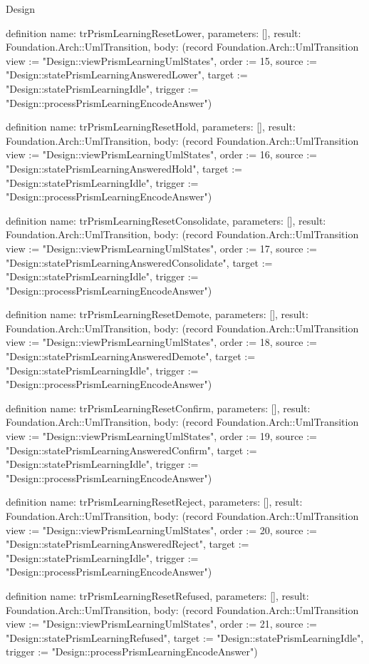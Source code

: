 \begin{lexlean}{Design}
\begin{semanticmodule}
definition{
  name: trPrismLearningResetLower,
  parameters: [],
  result: Foundation.Arch::UmlTransition,
  body: (record Foundation.Arch::UmlTransition {view := "Design::viewPrismLearningUmlStates", order := 15, source := "Design::statePrismLearningAnsweredLower", target := "Design::statePrismLearningIdle", trigger := "Design::processPrismLearningEncodeAnswer"})
}

definition{
  name: trPrismLearningResetHold,
  parameters: [],
  result: Foundation.Arch::UmlTransition,
  body: (record Foundation.Arch::UmlTransition {view := "Design::viewPrismLearningUmlStates", order := 16, source := "Design::statePrismLearningAnsweredHold", target := "Design::statePrismLearningIdle", trigger := "Design::processPrismLearningEncodeAnswer"})
}

definition{
  name: trPrismLearningResetConsolidate,
  parameters: [],
  result: Foundation.Arch::UmlTransition,
  body: (record Foundation.Arch::UmlTransition {view := "Design::viewPrismLearningUmlStates", order := 17, source := "Design::statePrismLearningAnsweredConsolidate", target := "Design::statePrismLearningIdle", trigger := "Design::processPrismLearningEncodeAnswer"})
}

definition{
  name: trPrismLearningResetDemote,
  parameters: [],
  result: Foundation.Arch::UmlTransition,
  body: (record Foundation.Arch::UmlTransition {view := "Design::viewPrismLearningUmlStates", order := 18, source := "Design::statePrismLearningAnsweredDemote", target := "Design::statePrismLearningIdle", trigger := "Design::processPrismLearningEncodeAnswer"})
}

definition{
  name: trPrismLearningResetConfirm,
  parameters: [],
  result: Foundation.Arch::UmlTransition,
  body: (record Foundation.Arch::UmlTransition {view := "Design::viewPrismLearningUmlStates", order := 19, source := "Design::statePrismLearningAnsweredConfirm", target := "Design::statePrismLearningIdle", trigger := "Design::processPrismLearningEncodeAnswer"})
}

definition{
  name: trPrismLearningResetReject,
  parameters: [],
  result: Foundation.Arch::UmlTransition,
  body: (record Foundation.Arch::UmlTransition {view := "Design::viewPrismLearningUmlStates", order := 20, source := "Design::statePrismLearningAnsweredReject", target := "Design::statePrismLearningIdle", trigger := "Design::processPrismLearningEncodeAnswer"})
}

definition{
  name: trPrismLearningResetRefused,
  parameters: [],
  result: Foundation.Arch::UmlTransition,
  body: (record Foundation.Arch::UmlTransition {view := "Design::viewPrismLearningUmlStates", order := 21, source := "Design::statePrismLearningRefused", target := "Design::statePrismLearningIdle", trigger := "Design::processPrismLearningEncodeAnswer"})
}


\end{semanticmodule}
\end{lexlean}
